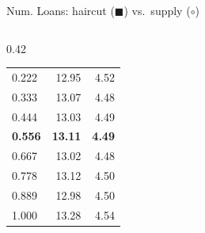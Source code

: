 \documentclass[aspectratio=169,10pt]{beamer}
\begin{document}
\begin{frame}{Num. Loans: haircut ($\blacksquare$) vs.\ supply ($\circ$)}
\begin{columns}[T]
\begin{column}{0.42\textwidth}
\begin{tabular}{lrr}
        0.222 & 12.95 & 4.52 \\
        0.333 & 13.07 & 4.48 \\
        0.444 & 13.03 & 4.49 \\
        \textbf{0.556} & \textbf{13.11} & \textbf{4.49} \\
        0.667 & 13.02 & 4.48 \\
        0.778 & 13.12 & 4.50 \\
        0.889 & 12.98 & 4.50 \\
        1.000 & 13.28 & 4.54 \\
        \bottomrule
      \end{tabular}
    \end{column}
  \end{columns}
\end{frame}
\end{document}
